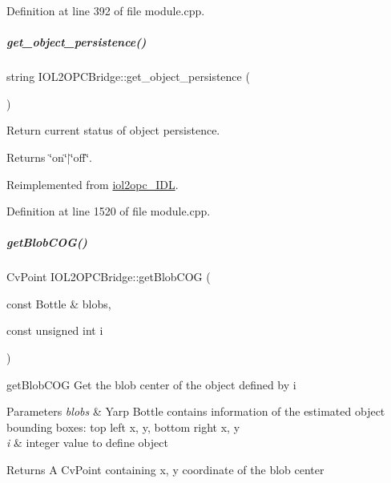Definition at line 392 of file module.\+cpp.

\mbox{\label{group__iol2opc_ac5ec9c3ba20773a056a266e8d6b5daae}} 
\subparagraph{\texorpdfstring{get\+\_\+object\+\_\+persistence()}{get\_object\_persistence()}}
{\footnotesize\ttfamily string I\+O\+L2\+O\+P\+C\+Bridge\+::get\+\_\+object\+\_\+persistence (\begin{DoxyParamCaption}{ }\end{DoxyParamCaption})\hspace{0.3cm}{\ttfamily [virtual]}}



Return current status of object persistence. 

\begin{DoxyReturn}{Returns}
\char`\"{}on\char`\"{}$\vert$\char`\"{}off\char`\"{}. 
\end{DoxyReturn}


Reimplemented from \hyperlink{classiol2opc__IDL_a51b8e076770a618ef676dd2ccdf4b35a}{iol2opc\+\_\+\+I\+DL}.



Definition at line 1520 of file module.\+cpp.

\mbox{\label{group__iol2opc_a9990bcbf744a34e01711e47a2a8a9205}} 
\subparagraph{\texorpdfstring{get\+Blob\+C\+O\+G()}{getBlobCOG()}}
{\footnotesize\ttfamily Cv\+Point I\+O\+L2\+O\+P\+C\+Bridge\+::get\+Blob\+C\+OG (\begin{DoxyParamCaption}\item[{const Bottle \&}]{blobs,  }\item[{const unsigned int}]{i }\end{DoxyParamCaption})\hspace{0.3cm}{\ttfamily [protected]}}



get\+Blob\+C\+OG Get the blob center of the object defined by i 


\begin{DoxyParams}{Parameters}
{\em blobs} & Yarp Bottle contains information of the estimated object bounding boxes\+: top left x, y, bottom right x, y \\
\hline
{\em i} & integer value to define object \\
\hline
\end{DoxyParams}
\begin{DoxyReturn}{Returns}
A Cv\+Point containing x, y coordinate of the blob center 
\end{DoxyReturn}


